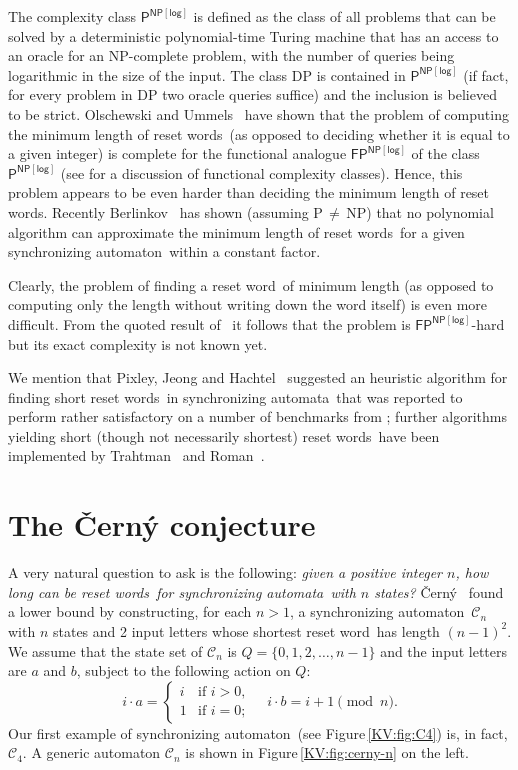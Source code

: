 \documentclass{irmaart}
\newcommand{\sa}{synchronizing au\-tom\-a\-ta}
\newcommand{\san}{synchronizing au\-tom\-a\-ton}
\newcommand{\sw}{reset word}
\newcommand{\sws}{reset words}
\begin{document}
The complexity class $\mathsf{P}^\mathsf{NP[log]}$ is defined as
the class of all problems that can be solved by a deterministic
polynomial-time Turing machine that has an access to an oracle for
an \textsf{NP}-complete problem, with the number of queries being
logarithmic in the size of the input. The class \textsf{DP} is
contained in $\mathsf{P}^\mathsf{NP[log]}$ (if fact, for every
problem in \textsf{DP} two oracle queries suffice) and the
inclusion is believed to be strict. Olschewski and
Ummels~\cite{Olschewski&Ummels:2010} have shown that the problem
of computing the minimum length of \sws\ (as opposed to deciding
whether it is equal to a given integer) is complete for the
functional analogue $\mathsf{FP}^\mathsf{NP[log]}$ of the class
$\mathsf{P}^\mathsf{NP[log]}$ (see \cite{Selman:1994} for a
discussion of functional complexity classes). Hence, this problem
appears to be even harder than deciding the minimum length of
\sws. Recently Berlinkov~\cite{Berlinkov:2010} has shown (assuming
\textsf{P}\,$\ne$\,\textsf{NP}) that no polynomial algorithm can
approximate the minimum length of \sws\ for a given \san\ within a
constant factor.

Clearly, the problem of finding a \sw\ of minimum length (as
opposed to computing only the length without writing down the word
itself) is even more difficult. From the quoted result
of~\cite{Olschewski&Ummels:2010} it follows that the problem is
$\mathsf{FP}^\mathsf{NP[log]}$-hard but its exact complexity is
not known yet.

We mention that Pixley, Jeong and
Hachtel~\cite{Pixley&Jeong&Hachtel:1992} suggested an heuristic
algorithm for finding short \sws\ in \sa\ that was reported to
perform rather satisfactory on a number of benchmarks from
\cite{Yang:1991}; further algorithms yielding short (though not
necessarily shortest) \sws\ have been implemented by
Trahtman~\cite{Trahtman:2006} and Roman~\cite{Roman:2009}.

\section{The \v{C}ern\'{y} conjecture}

A very natural question to ask is the following: \emph{given a
positive integer $n$, how long can be \sws\ for \sa\ with $n$
states?} \v{C}ern\'{y}~\cite{Cerny:1964} found a lower bound by
constructing, for each $n>1$, a \san\ $\mathcal{C}_n$ with $n$
states and 2 input letters whose shortest \sw\ has length
$(n-1)^2$. We assume that the state set of $\mathcal{C}_n$ is
$Q=\{0,1,2,\dots,n-1\}$ and the input letters are $a$ and $b$,
subject to the following action on $Q$:
\begin{displaymath}
i\cdot a=\begin{cases}
i &\text{if } i>0,\\
1 &\text{if } i=0;
\end{cases}\quad
i\cdot b=i+1\!\!\pmod{n}.
\end{displaymath}
Our first example of \san\ (see Figure\,\ref{KV:fig:C4}) is, in
fact, $\mathcal{C}_4$. A generic automaton $\mathcal{C}_n$ is
shown in Figure\,\ref{KV:fig:cerny-n} on the left.
\end{document}
